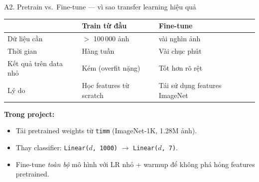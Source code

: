\documentclass[10pt, aspectratio=169]{beamer}
\begin{document}
\begin{frame}{A2. Pretrain vs.\ Fine-tune --- vì sao transfer learning hiệu quả}
    \footnotesize
    \begin{table}[]
        \centering
        \begin{tabular}{lll}
        \toprule
        \rowcolor{usthblue!25} & \textbf{Train từ đầu} & \textbf{Fine-tune} \\
        \midrule
        Dữ liệu cần   & $>$ 100\,000 ảnh         & vài nghìn ảnh \\
        Thời gian     & Hàng tuần                 & Vài chục phút \\
        Kết quả trên data nhỏ & Kém (overfit nặng) & Tốt hơn rõ rệt \\
        Lý do         & Học features từ scratch  & Tái sử dụng features ImageNet \\
        \bottomrule
        \end{tabular}
    \end{table}

    \vspace{0.3cm}
    \textbf{Trong project:}
    \begin{itemize}
        \item Tải pretrained weights từ \texttt{timm} (ImageNet-1K, 1.28M ảnh).
        \item Thay classifier: \texttt{Linear($d$, 1000)} $\rightarrow$ \texttt{Linear($d$, 7)}.
        \item Fine-tune \textit{toàn bộ} mô hình với LR nhỏ $+$ warmup để không phá hỏng features pretrained.
    \end{itemize}
\end{frame}
\end{document}

